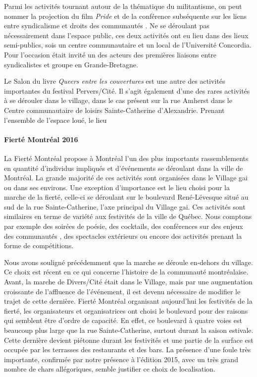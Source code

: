 Parmi les activités tournant autour de la thématique du militantisme, on peut nommer la projection du film \emph{Pride} et de la conférence subséquente sur les liens entre syndicalisme et droits des communautés \lgbt{}.
Ne se déroulant pas nécessairement dans l'espace public, ces deux activités ont eu lieu dans des lieux semi-publics, sois un centre communautaire et un local de l'Université Concordia.
Pour l'occasion était invité un des acteurs  des premières liaisons entre syndicalistes et groupe \lgbt{} en Grande-Bretagne.

Le Salon du livre \emph{Queers entre les couvertures} est une autre des activités importantes du festival Pervers/Cité.
Il s'agit également d'une des rares activités à se dérouler dans le village, dans le cas présent sur la rue Amherst dans le Centre communautaire de loisirs Sainte-Catherine d'Alexandrie.
Prenant l'ensemble de l'espace loué, le lieu

\paragraph{Fierté Montréal 2016}
\label{subsec:fiertemontreal2016}
La Fierté Montréal propose à Montréal l'un des plus importants rassemblements \lgbt en quantité d'individus impliqués et d'événements se déroulant dans la ville de Montréal.
La grande majorité de ces activités sont organisées dans le Village gai ou dans ses environs.
Une exception d'importance est le lieu choisi pour la marche de la fierté, celle-ci se déroulant sur le boulevard René-Lévesque situé au sud de la rue Sainte-Catherine, l'axe principal du Village gai.
Ces activités sont similaires en terme de variété aux festivités de la ville de Québec.
Nous comptons par exemple des soirées de poésie, des cocktails, des conférences sur des enjeux des communautés \lgbt, des spectacles extérieurs ou encore des activités prenant la forme de compétitions.


Nous avons souligné précédemment que la marche se déroule en-dehors du village.
Ce choix est récent en ce qui concerne l'histoire de la communauté \lgbt montréalaise.
Avant, la marche de Divers/Cité était dans le Village, mais par une augmentation croissante de l'affluence de l'événement, il est devenu nécessaire de modifier le trajet de cette dernière.
Fierté Montréal organisant aujourd'hui les festivités de la fierté, les organisateurs et organisatrices ont choisi le boulevard pour des raisons qui semblent être d'ordre de capacité.
En effet, ce boulevard à quatre voies est beaucoup plus large que la rue Sainte-Catherine, surtout durant la saison estivale.
Cette dernière devient piétonne durant les festivités et une partie de la surface est occupée par les terrasses des restaurants et des bars.
La présence d'une foule très importante, confirmée par notre présence à l'édition 2015, avec un très grand nombre de chars allégoriques, semble justifier ce choix de localisation.

